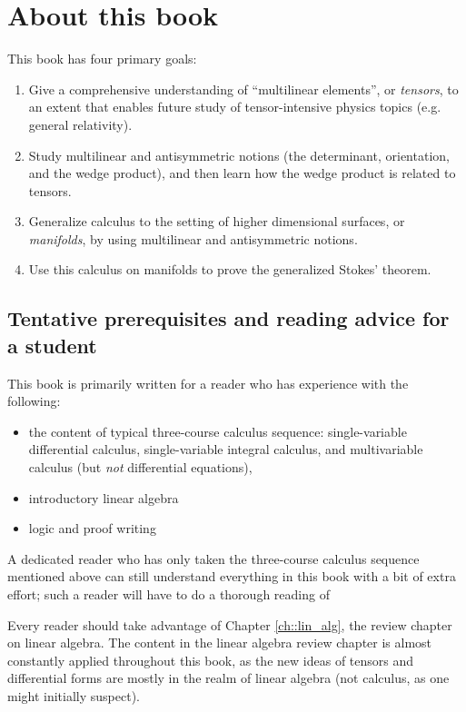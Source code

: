\chapter*{About this book}

This book has four primary goals:

\begin{enumerate}
    \item Give a comprehensive understanding of ``multilinear elements'', or \textit{tensors}, to an extent that enables future study of tensor-intensive physics topics (e.g. general relativity).
    \item Study multilinear and antisymmetric notions (the determinant, orientation, and the wedge product), and then learn how the wedge product is related to tensors.
    \item Generalize calculus to the setting of higher dimensional surfaces, or \textit{manifolds}, by using multilinear and antisymmetric notions.
    \item Use this calculus on manifolds to prove the generalized Stokes' theorem.
\end{enumerate}

\section*{Tentative prerequisites and reading advice for a student}

This book is primarily written for a reader who has experience with the following:

\begin{itemize}
    \item the content of typical three-course calculus sequence: single-variable differential calculus, single-variable integral calculus, and multivariable calculus (but \textit{not} differential equations),
    \item introductory linear algebra
    \item logic and proof writing
\end{itemize}

A dedicated reader who has only taken the three-course calculus sequence mentioned above can still understand everything in this book with a bit of extra effort; such a reader will have to do a thorough reading of 

Every reader should take advantage of Chapter \ref{ch::lin_alg}, the review chapter on linear algebra. The content in the linear algebra review chapter is almost constantly applied throughout this book, as the new ideas of tensors and differential forms are mostly in the realm of linear algebra (not calculus, as one might initially suspect).

